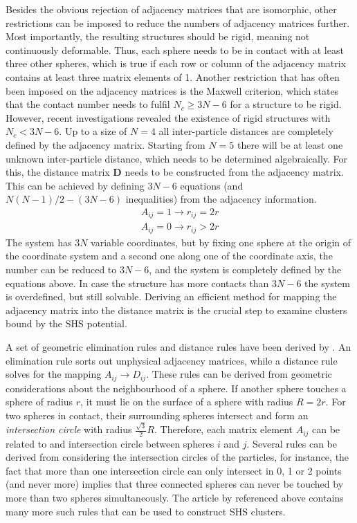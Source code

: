 Besides the obvious rejection of adjacency matrices that are isomorphic, other
restrictions can be imposed to reduce the numbers of adjacency matrices further.
Most importantly, the resulting structures should be rigid, meaning not
continuously deformable. Thus, each sphere needs to be in contact with at least
three other spheres, which is true if each row or column of the adjacency matrix
contains at least three matrix elements of 1. Another restriction that has often
been imposed on the adjacency matrices is the Maxwell criterion, which states
that the contact number needs to fulfil $N_c\geq 3N-6$ for a structure to be
rigid.\autocite{Maxwell_calculationequilibriumstiffness_1864} However, recent
investigations revealed the existence of rigid structures with $N_c<
3N-6$.\autocite{Holmes-Cerfon_EnumeratingRigidSphere_2016} Up to a size of $N=4$
all inter-particle distances are completely defined by the adjacency matrix.
Starting from $N=5$ there will be at least one unknown inter-particle distance,
which needs to be determined algebraically. For this, the distance matrix
$\mathbf{D}$ needs to be constructed from the adjacency matrix. This can be
achieved by defining $3N-6$ equations (and $N(N-1)/2 - (3N-6)$ inequalities)
from the adjacency information.
%
\begin{align}
    A_{ij}=1\rightarrow r_{ij}=2r\\
    A_{ij}=0\rightarrow r_{ij}>2r
\end{align}
%
The system has $3N$ variable coordinates, but by fixing one sphere at the origin
of the coordinate system and a second one along one of the coordinate axis, the
number can be reduced to $3N-6$, and the system is completely defined by the
equations above. In case the structure has more contacts than $3N-6$ the system
is overdefined, but still solvable. Deriving an efficient method for mapping the
adjacency matrix into the distance matrix is the crucial step to examine
clusters bound by the \ac{SHS} potential.

A set of geometric elimination rules and distance rules have been derived by
\citeauthor{Arkus_DerivingFiniteSphere_2011}\autocite{Arkus_DerivingFiniteSphere_2011}.
An elimination rule sorts out unphysical adjacency matrices, while a distance
rule solves for the mapping $A_{ij}\to D_{ij}$. These rules
can be derived from geometric considerations about the neighbourhood of a
sphere. If another sphere touches a sphere of radius $r$, it must lie on the
surface of a sphere with radius $R=2r$. For two spheres in contact, their
surrounding spheres intersect and form an \textit{intersection circle} with
radius $\frac{\sqrt{3}}{2}R$. Therefore, each matrix element $A_{ij}$
can be related to and intersection circle between spheres $i$ and $j$. Several
rules can be derived from considering the intersection circles of the particles,
for instance, the fact that more than one intersection circle can only intersect
in 0, 1 or 2 points (and never more) implies that three connected spheres can
never be touched by more than two spheres simultaneously. The article by
\citeauthor{Arkus_DerivingFiniteSphere_2011} referenced above contains many more
such rules that can be used to construct \ac{SHS} clusters.

